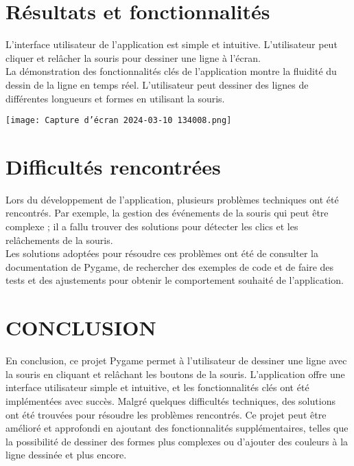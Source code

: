 \documentclass[a4paper, 12px]{article}
\begin{document}
\section{Résultats et fonctionnalités }
\par L'interface utilisateur de l'application est simple et intuitive. L'utilisateur peut cliquer et relâcher la souris pour dessiner une ligne à l'écran.\\
La démonstration des fonctionnalités clés de l'application montre la fluidité du dessin de la ligne en temps réel. L'utilisateur peut dessiner des lignes de différentes longueurs et formes en utilisant la souris. \\
\begin{center}
\texttt{[image: Capture d'écran 2024-03-10 134008.png]}
\end{center}

\section{Difficultés rencontrées}
Lors du développement de l'application, plusieurs problèmes techniques ont été rencontrés. Par exemple, la gestion des événements de la souris qui peut être complexe ; il a fallu trouver des solutions pour détecter les clics et les relâchements de la souris.\\
Les solutions adoptées pour résoudre ces problèmes ont été de consulter la documentation de Pygame, de rechercher des exemples de code et de faire des tests et des ajustements pour obtenir le comportement souhaité de l'application.

\section{CONCLUSION}
En conclusion, ce projet Pygame permet à l'utilisateur de dessiner une ligne avec la souris en cliquant et relâchant les boutons de la souris. L'application offre une interface utilisateur simple et intuitive, et les fonctionnalités clés ont été implémentées avec succès. Malgré quelques difficultés techniques, des solutions ont été trouvées pour résoudre les problèmes rencontrés. Ce projet peut être amélioré et approfondi en ajoutant des fonctionnalités supplémentaires, telles que la possibilité de dessiner des formes plus complexes ou d'ajouter des couleurs à la ligne dessinée et plus encore.
\end{document}
